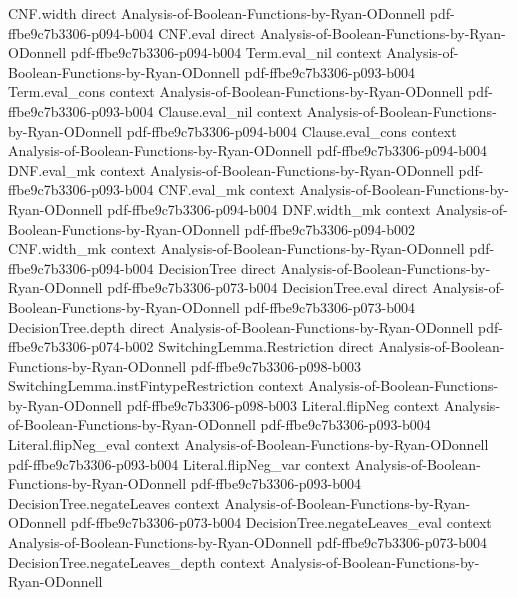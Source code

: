\begin{theorem}
\proofstep
  {CNF.width}
  {direct}
  {Analysis-of-Boolean-Functions-by-Ryan-ODonnell}
  {pdf-ffbe9c7b3306-p094-b004}
\proofstep
  {CNF.eval}
  {direct}
  {Analysis-of-Boolean-Functions-by-Ryan-ODonnell}
  {pdf-ffbe9c7b3306-p094-b004}
\proofstep
  {Term.eval_nil}
  {context}
  {Analysis-of-Boolean-Functions-by-Ryan-ODonnell}
  {pdf-ffbe9c7b3306-p093-b004}
\proofstep
  {Term.eval_cons}
  {context}
  {Analysis-of-Boolean-Functions-by-Ryan-ODonnell}
  {pdf-ffbe9c7b3306-p093-b004}
\proofstep
  {Clause.eval_nil}
  {context}
  {Analysis-of-Boolean-Functions-by-Ryan-ODonnell}
  {pdf-ffbe9c7b3306-p094-b004}
\proofstep
  {Clause.eval_cons}
  {context}
  {Analysis-of-Boolean-Functions-by-Ryan-ODonnell}
  {pdf-ffbe9c7b3306-p094-b004}
\proofstep
  {DNF.eval_mk}
  {context}
  {Analysis-of-Boolean-Functions-by-Ryan-ODonnell}
  {pdf-ffbe9c7b3306-p093-b004}
\proofstep
  {CNF.eval_mk}
  {context}
  {Analysis-of-Boolean-Functions-by-Ryan-ODonnell}
  {pdf-ffbe9c7b3306-p094-b004}
\proofstep
  {DNF.width_mk}
  {context}
  {Analysis-of-Boolean-Functions-by-Ryan-ODonnell}
  {pdf-ffbe9c7b3306-p094-b002}
\proofstep
  {CNF.width_mk}
  {context}
  {Analysis-of-Boolean-Functions-by-Ryan-ODonnell}
  {pdf-ffbe9c7b3306-p094-b004}
\proofstep
  {DecisionTree}
  {direct}
  {Analysis-of-Boolean-Functions-by-Ryan-ODonnell}
  {pdf-ffbe9c7b3306-p073-b004}
\proofstep
  {DecisionTree.eval}
  {direct}
  {Analysis-of-Boolean-Functions-by-Ryan-ODonnell}
  {pdf-ffbe9c7b3306-p073-b004}
\proofstep
  {DecisionTree.depth}
  {direct}
  {Analysis-of-Boolean-Functions-by-Ryan-ODonnell}
  {pdf-ffbe9c7b3306-p074-b002}
\proofstep
  {SwitchingLemma.Restriction}
  {direct}
  {Analysis-of-Boolean-Functions-by-Ryan-ODonnell}
  {pdf-ffbe9c7b3306-p098-b003}
\proofstep
  {SwitchingLemma.instFintypeRestriction}
  {context}
  {Analysis-of-Boolean-Functions-by-Ryan-ODonnell}
  {pdf-ffbe9c7b3306-p098-b003}
\proofstep
  {Literal.flipNeg}
  {context}
  {Analysis-of-Boolean-Functions-by-Ryan-ODonnell}
  {pdf-ffbe9c7b3306-p093-b004}
\proofstep
  {Literal.flipNeg_eval}
  {context}
  {Analysis-of-Boolean-Functions-by-Ryan-ODonnell}
  {pdf-ffbe9c7b3306-p093-b004}
\proofstep
  {Literal.flipNeg_var}
  {context}
  {Analysis-of-Boolean-Functions-by-Ryan-ODonnell}
  {pdf-ffbe9c7b3306-p093-b004}
\proofstep
  {DecisionTree.negateLeaves}
  {context}
  {Analysis-of-Boolean-Functions-by-Ryan-ODonnell}
  {pdf-ffbe9c7b3306-p073-b004}
\proofstep
  {DecisionTree.negateLeaves_eval}
  {context}
  {Analysis-of-Boolean-Functions-by-Ryan-ODonnell}
  {pdf-ffbe9c7b3306-p073-b004}
\proofstep
  {DecisionTree.negateLeaves_depth}
  {context}
  {Analysis-of-Boolean-Functions-by-Ryan-ODonnell}

\end{theorem}
